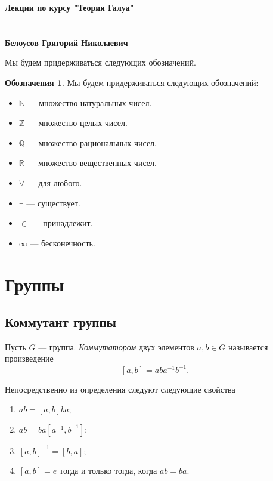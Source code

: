 \documentclass[12pt, titlepage, oneside]{amsbook}
\date{}
\newcommand{\NN}{\mathbb{N}}
\newcommand{\ZZ}{\mathbb{Z}}
\newcommand{\RR}{\mathbb{R}}
\newcommand{\QQ}{\mathbb{Q}}
\theoremstyle{definition}
\newtheorem{notation}[theorem]{Обозначения}
\theoremstyle{remark}
\begin{document}
\begin{titlepage}
\begin{center}
\large{\textbf{Лекции по курсу "Теория Галуа"}} \quad \\
\quad
\\ \quad
\\ \quad
\large{\textbf{Белоусов Григорий Николаевич}} \quad \\ \quad

\end{center}
\end{titlepage}

\tableofcontents

Мы будем придерживаться следующих обозначений.

\begin{notation}
\label{not}  Мы будем придерживаться следующих обозначений:
\begin{itemize}
\item $\NN$ --- множество натуральных чисел.
\item $\ZZ$ --- множество целых чисел.
\item $\QQ$ --- множество рациональных чисел.
\item $\RR$ --- множество вещественных чисел.
\item $\forall$ --- для любого.
\item $\exists$ --- существует.
\item $\in$ --- принадлежит.
\item $\infty$ --- бесконечность.
\end{itemize}
\end{notation}

\chapter{Группы}



\section{Коммутант группы}

Пусть $G$ --- группа. \emph{Коммутатором} двух элементов $a,b\in G$ называется произведение $$[a,b]=aba^{-1}b^{-1}.$$

Непосредственно из определения следуют следующие свойства
\begin{enumerate}
\item $ab=[a,b]ba$;
\item $ab=ba[a^{-1},b^{-1}]$;
\item $[a,b]^{-1}=[b,a]$;
\item $[a,b]=e$ тогда и только тогда, когда $ab=ba$.
\end{enumerate}
\end{document}
